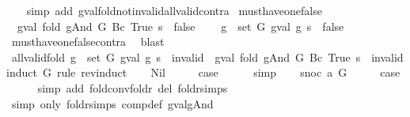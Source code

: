 \begin{isabellebody}
\ \ \isamarkupfalse%
\ {\isacharparenleft}simp\ add{\isacharcolon}\ gval{\isacharunderscore}fold{\isacharunderscore}not{\isacharunderscore}invalid{\isacharunderscore}all{\isacharunderscore}valid{\isacharunderscore}contra{\isacharparenright}%
\endisatagproof
{\isafoldproof}%
%
\isadelimproof
\isanewline
%
\endisadelimproof
\isanewline
{}\isamarkupfalse%
\ must{\isacharunderscore}have{\isacharunderscore}one{\isacharunderscore}false{\isacharcolon}\isanewline
\ \ {\isachardoublequoteopen}gval\ {\isacharparenleft}fold\ gAnd\ G\ {\isacharparenleft}Bc\ True{\isacharparenright}{\isacharparenright}\ s\ {\isacharequal}\ false\ {\isasymLongrightarrow}\isanewline
\ \ \ {\isasymexists}g\ {\isasymin}\ set\ G{\isachardot}\ gval\ g\ s\ {\isacharequal}\ false{\isachardoublequoteclose}\isanewline
%
\isadelimproof
\ \ %
\endisadelimproof
%
\isatagproof
{}\isamarkupfalse%
\ must{\isacharunderscore}have{\isacharunderscore}one{\isacharunderscore}false{\isacharunderscore}contra\ \isamarkupfalse%
\ blast%
\endisatagproof
{\isafoldproof}%
%
\isadelimproof
\isanewline
%
\endisadelimproof
\isanewline
{}\isamarkupfalse%
\ all{\isacharunderscore}valid{\isacharunderscore}fold{\isacharcolon}\ {\isachardoublequoteopen}{\isasymforall}g\ {\isasymin}\ set\ G{\isachardot}\ gval\ g\ s\ {\isasymnoteq}\ invalid\ {\isasymLongrightarrow}\ gval\ {\isacharparenleft}fold\ gAnd\ G\ {\isacharparenleft}Bc\ True{\isacharparenright}{\isacharparenright}\ s\ {\isasymnoteq}\ invalid{\isachardoublequoteclose}\isanewline
%
\isadelimproof
%
\endisadelimproof
%
\isatagproof
{}\isamarkupfalse%
{\isacharparenleft}induct\ G\ rule{\isacharcolon}\ rev{\isacharunderscore}induct{\isacharparenright}\isanewline
\ \ \isamarkupfalse%
\ Nil\isanewline
\ \ \isamarkupfalse%
\ \isamarkupfalse%
\ {\isacharquery}case\isanewline
\ \ \ \ \isamarkupfalse%
\ simp\isanewline
{}\isamarkupfalse%
\isanewline
\ \ \isamarkupfalse%
\ {\isacharparenleft}snoc\ a\ G{\isacharparenright}\isanewline
\ \ \isamarkupfalse%
\ \isamarkupfalse%
\ {\isacharquery}case\isanewline
\ \ \ \ \isamarkupfalse%
\ {\isacharparenleft}simp\ add{\isacharcolon}\ fold{\isacharunderscore}conv{\isacharunderscore}foldr\ del{\isacharcolon}\ foldr{\isachardot}simps{\isacharparenright}\isanewline
\ \ \ \ \isamarkupfalse%
\ {\isacharparenleft}simp\ only{\isacharcolon}\ foldr{\isachardot}simps\ comp{\isacharunderscore}def\ gval{\isacharunderscore}gAnd{\isacharparenright}\isanewline

\end{isabellebody}
